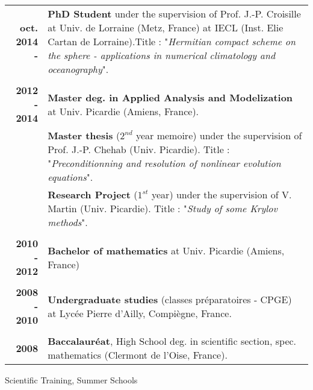 \documentclass[10pt,a4paper]{report}
\begin{document}
\begin{center}
\begin{tabular}{r p{12cm}}
\textbf{oct. 2014 - } & \textbf{PhD Student} under the supervision of Prof. J.-P. Croisille at Univ. de Lorraine (Metz, France) at IECL (Inst. Elie Cartan de Lorraine).\newline Title : "\textit{Hermitian compact scheme on the sphere - applications in numerical climatology and oceanography}".\\

& \\

\textbf{2012 - 2014} & \textbf{Master deg. in Applied Analysis and Modelization} at Univ. Picardie (Amiens, France). \\

& \textbf{Master thesis} ($2^{nd}$ year memoire) under the supervision of Prof. J.-P. Chehab (Univ. Picardie). \newline 
Title : "\textit{Preconditionning and resolution of nonlinear evolution equations}". \\

& \textbf{Research Project} ($1^{st}$ year) under the supervision of V. Martin (Univ. Picardie). \newline 
Title : "\textit{Study of some Krylov methods}". \\

& \\

\textbf{2010 - 2012} & \textbf{Bachelor of mathematics} at Univ. Picardie (Amiens, France) \\

& \\

\textbf{2008 - 2010} & \textbf{Undergraduate studies} (classes préparatoires - CPGE) at Lycée Pierre d'Ailly, Compiègne, France.\\

& \\

\textbf{2008} & \textbf{Baccalauréat}, High School deg. in scientific section, spec. mathematics (Clermont de l'Oise, France).\\
\end{tabular}
\end{center}

\vspace{.5cm}
\noindent
{\selectfont
\begin{Large}
Scientific Training, Summer Schools
\end{Large}
\hrulefill
}
\end{document}
